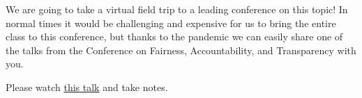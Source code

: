\documentclass[assignment04_Solutions]{subfiles}
\begin{document}
We are going to take a virtual field trip to a leading conference on this topic! In normal times it would be challenging and expensive for us to bring the entire class to this conference, but thanks to the pandemic we can easily share one of the talks from the Conference on Fairness, Accountability, and Transparency with you. 

\begin{exercise}
Please watch \href{https://www.youtube.com/watch?v=rSOZhv4bqQU&list=PLXA0IWa3BpHnYVwSLuvv1Jv1U1Pyhcymt&index=8}{this talk} and take notes. 
\end{exercise}



%
%
%
%
%
%

\end{document}
